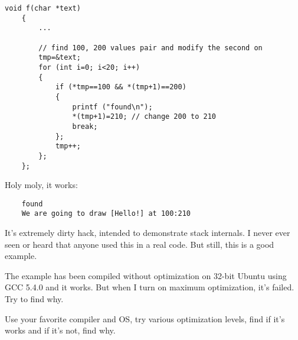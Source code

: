 \begin{lstlisting}[style=customc]
	void f(char *text)
	{
		...

		// find 100, 200 values pair and modify the second on
		tmp=&text;
		for (int i=0; i<20; i++)
		{
			if (*tmp==100 && *(tmp+1)==200)
			{
				printf ("found\n");
				*(tmp+1)=210; // change 200 to 210
				break;
			};
			tmp++;
		};
	};
\end{lstlisting}

Holy moly, it works:

\begin{lstlisting}
	found
	We are going to draw [Hello!] at 100:210
\end{lstlisting}


It's extremely dirty hack, intended to demonstrate stack internals.
I never ever seen or heard that anyone used this in a real code.
But still, this is a good example.

\myparagraph{\Exercise}

The example has been compiled without optimization on 32-bit Ubuntu using GCC 5.4.0 and it works.
But when I turn on  maximum optimization, it's failed.
Try to find why.

Use your favorite compiler and OS, try various optimization levels, find if it's works and if it's not, find why.

